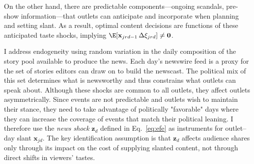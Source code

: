 \documentclass[12pt]{article}
\begin{document}
	
On the other hand, there are predictable components—ongoing scandals, pre-show information—that outlets can anticipate and incorporate when planning and setting slant. As a result,  optimal content decisions are functions of these anticipated taste shocks, implying $\E[\mathbf{x}_{jrd-1}\,\Delta\xi_{jrd}] \neq \mathbf{0}$.
	

	I address endogeneity using random variation in the daily composition of the story pool available to produce the news. Each day’s newswire feed is a proxy for the set of stories editors can draw on to build the newscast. The political mix of this set determines what is newsworthy and thus constrains what outlets can speak about. Although these shocks are common to all outlets, they affect outlets asymmetrically. Since events are not predictable and outlets wish to maintain their stance, they need to take advantage of politically "favorable" days where they can increase the coverage of events that match their political leaning. I therefore use the \emph{news shock} $\mathbf{z}_d$ defined in Eq.~\eqref{eq:efe} as instruments for outlet–day slant $\mathbf{x}_{jd}$. The key identification assumption is that $\mathbf{z}_d$ affects audience shares only through its impact on the cost of supplying slanted content, not through direct shifts in viewers’ tastes.
	
	
	
	
	
	
\end{document}
